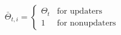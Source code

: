 \begin{equation*}  
  \bar{\Theta}_{t,i} =
\begin{cases}
   \Theta_{t} & \text{for updaters}
\\   1          & \text{for nonupdaters}
\end{cases}
\end{equation*}
